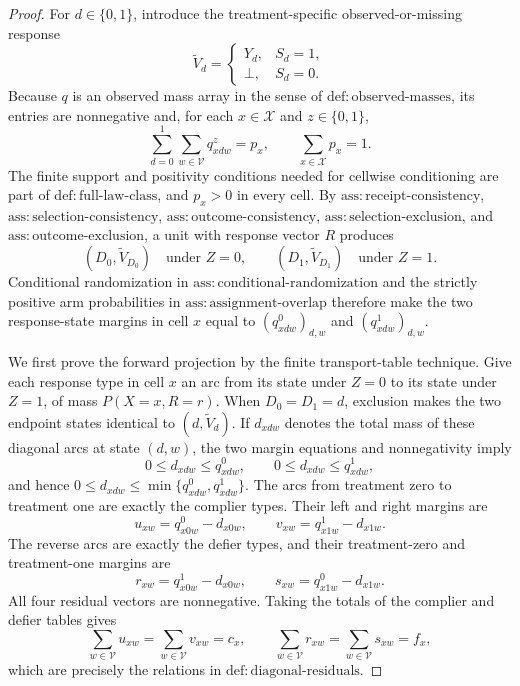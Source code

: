 \documentclass{article}
\begin{document}
\begin{proof}
For \(d\in\{0,1\}\), introduce the treatment-specific observed-or-missing response
\[
 \widetilde V_d=
 \begin{cases}
 Y_d,&S_d=1,\\
 \bot,&S_d=0.
 \end{cases}
\]
Because \(q\) is an observed mass array in the sense of \(\mathrm{def:observed\text{-}masses}\), its entries are nonnegative and, for each \(x\in\mathcal X\) and \(z\in\{0,1\}\),
\[
 \sum_{d=0}^1\sum_{w\in\mathcal V}q^z_{xdw}=p_x,
 \qquad
 \sum_{x\in\mathcal X}p_x=1.
\]
The finite support and positivity conditions needed for cellwise conditioning are part of \(\mathrm{def:full\text{-}law\text{-}class}\), and \(p_x>0\) in every cell.  By \(\mathrm{ass:receipt\text{-}consistency}\), \(\mathrm{ass:selection\text{-}consistency}\), \(\mathrm{ass:outcome\text{-}consistency}\), \(\mathrm{ass:selection\text{-}exclusion}\), and \(\mathrm{ass:outcome\text{-}exclusion}\), a unit with response vector \(R\) produces
\[
 (D_0,\widetilde V_{D_0})\quad\text{under }Z=0,
 \qquad
 (D_1,\widetilde V_{D_1})\quad\text{under }Z=1.
\]
Conditional randomization in \(\mathrm{ass:conditional\text{-}randomization}\) and the strictly positive arm probabilities in \(\mathrm{ass:assignment\text{-}overlap}\) therefore make the two response-state margins in cell \(x\) equal to \((q^0_{xdw})_{d,w}\) and \((q^1_{xdw})_{d,w}\).

We first prove the forward projection by the finite transport-table technique.  Give each response type in cell \(x\) an arc from its state under \(Z=0\) to its state under \(Z=1\), of mass \(P(X=x,R=r)\).  When \(D_0=D_1=d\), exclusion makes the two endpoint states identical to \((d,\widetilde V_d)\).  If \(d_{xdw}\) denotes the total mass of these diagonal arcs at state \((d,w)\), the two margin equations and nonnegativity imply
\[
 0\leq d_{xdw}\leq q^0_{xdw},
 \qquad
 0\leq d_{xdw}\leq q^1_{xdw},
\]
and hence \(0\leq d_{xdw}\leq\min\{q^0_{xdw},q^1_{xdw}\}\).  The arcs from treatment zero to treatment one are exactly the complier types.  Their left and right margins are
\[
 u_{xw}=q^0_{x0w}-d_{x0w},
 \qquad
 v_{xw}=q^1_{x1w}-d_{x1w}.
\]
The reverse arcs are exactly the defier types, and their treatment-zero and treatment-one margins are
\[
 r_{xw}=q^1_{x0w}-d_{x0w},
 \qquad
 s_{xw}=q^0_{x1w}-d_{x1w}.
\]
All four residual vectors are nonnegative.  Taking the totals of the complier and defier tables gives
\[
 \sum_{w\in\mathcal V}u_{xw}
 =\sum_{w\in\mathcal V}v_{xw}=c_x,
 \qquad
 \sum_{w\in\mathcal V}r_{xw}
 =\sum_{w\in\mathcal V}s_{xw}=f_x,
\]
which are precisely the relations in \(\mathrm{def:diagonal\text{-}residuals}\).


\end{proof}
\end{document}
